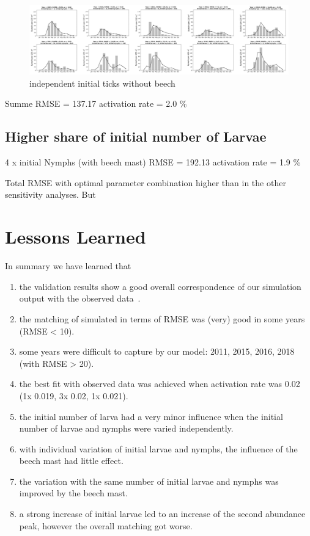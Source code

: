 \documentclass[a4paper, 11pt]{scrartcl}
\begin{document}
\begin{figure}[h!]
\centering
\includegraphics[width=1.0\textwidth]{figures/independent_initial_ticks_without_beech.PNG}
\caption{independent initial ticks without beech}
\label{fig:independent_initial_ticks_without_beech}
\end{figure}

Summe RMSE = 137.17
activation rate = 2.0 \%


\subsection{Higher share of initial number of Larvae}
4 x initial Nymphs (with beech mast)
RMSE = 192.13
activation rate = 1.9 \%

Total RMSE with optimal parameter combination higher than in the other sensitivity analyses. But


\section{Lessons Learned}


In summary we have learned that

\begin{enumerate}
\item the validation results show a good overall correspondence of our simulation output with the observed data~\parencite{Brugger.2017}.
\item the matching of simulated in terms of RMSE was (very) good in some years (RMSE < 10).
\item some years were difficult to capture by our model: 2011, 2015, 2016, 2018 (with RMSE > 20).
\item the best fit with observed data was achieved when activation rate was 0.02 (1x 0.019,  3x 0.02,  1x 0.021).
\item the initial number of larva had a very minor influence when the initial number of larvae and nymphs were varied independently.
\item with individual variation of initial larvae and nymphs, the influence of the beech mast had little effect.
\item the variation with the same number of initial larvae and nymphs was improved by the beech mast.
\item a strong increase of initial larvae led to an increase of the second abundance peak, however the overall matching got worse.
\end{enumerate}


\printbibliography[heading = bibintoc, title = {Bibliography}]
\end{document}
